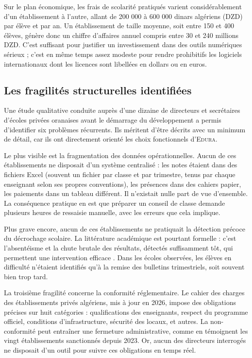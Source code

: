 \documentclass[12pt,a4paper,oneside]{report}
\newcommand{\edura}{\textsc{Edura}}
\begin{document}
Sur le plan économique, les frais de scolarité pratiqués varient considérablement d'un établissement à l'autre, allant de 200 000 à 600 000 dinars algériens (\ac{DZD}) par élève et par an. Un établissement de taille moyenne, soit entre 150 et 400 élèves, génère donc un chiffre d'affaires annuel compris entre 30 et 240 millions \ac{DZD}. C'est suffisant pour justifier un investissement dans des outils numériques sérieux ; c'est en même temps assez modeste pour rendre prohibitifs les logiciels internationaux dont les licences sont libellées en dollars ou en euros.

\subsection{Les fragilités structurelles identifiées}

Une étude qualitative conduite auprès d'une dizaine de directeurs et secrétaires d'écoles privées oranaises avant le démarrage du développement a permis d'identifier six problèmes récurrents. Ils méritent d'être décrits avec un minimum de détail, car ils ont directement orienté les choix fonctionnels d'\edura{}.

Le plus visible est la fragmentation des données opérationnelles. Aucun de ces établissements ne disposait d'un système centralisé : les notes étaient dans des fichiers Excel (souvent un fichier par classe et par trimestre, tenus par chaque enseignant selon ses propres conventions), les présences dans des cahiers papier, les paiements dans un tableau différent. Il n'existait nulle part de vue d'ensemble. La conséquence pratique en est que préparer un conseil de classe demande plusieurs heures de ressaisie manuelle, avec les erreurs que cela implique.

Plus grave encore, aucun de ces établissements ne pratiquait la détection précoce du décrochage scolaire. La littérature académique est pourtant formelle : c'est l'absentéisme et la chute brutale des résultats, détectés suffisamment tôt, qui permettent une intervention efficace \autocite{balfanz2007preventing}. Dans les écoles observées, les élèves en difficulté n'étaient identifiés qu'à la remise des bulletins trimestriels, soit souvent bien trop tard.

La troisième fragilité concerne la conformité réglementaire. Le cahier des charges des établissements privés algériens, mis à jour en 2026, impose des obligations précises sur huit catégories : qualifications des enseignants, respect du programme officiel, conditions d'infrastructure, sécurité des locaux, et autres. La non-conformité peut entraîner une fermeture administrative, comme en témoignent les vingt établissements sanctionnés depuis 2023. Or, aucun des directeurs interrogés ne disposait d'un outil pour suivre ces obligations en temps réel.
\end{document}
